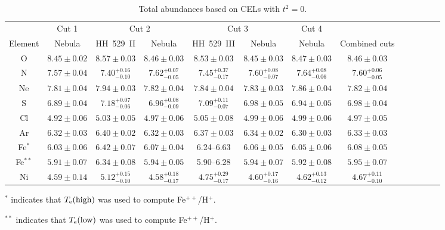 \documentclass[fleqn,usenatbib]{mnras}
\begin{document}
\begin{table*}
\centering
\caption{Total abundances based on CELs with $t^2=0$.}
\label{tab:total_abundances_cels}
\begin{adjustbox}{width=\textwidth}
\begin{tabular}{ccccccccccccc}
\hline
 & \multicolumn{1}{c}{Cut 1} & \multicolumn{2}{c}{Cut 2} & \multicolumn{2}{c}{Cut 3} & \multicolumn{1}{c}{Cut 4} \\
Element &  Nebula & HH~529~II &  Nebula & HH~529~III &  Nebula &  Nebula & Combined cuts\\
\hline

O & $8.45 \pm 0.02$ & $8.57 \pm 0.03$ & $8.46 \pm 0.03$ & $8.53 \pm 0.03$  & $8.45 \pm 0.03$&$8.47 \pm 0.03$&$8.46 \pm 0.03$\\

N & $7.57 \pm 0.04$ & $7.40 ^{+0.16} _{-0.10}$ & $7.62 ^{+0.07} _{-0.05}$ &  $7.45 ^{+0.37} _{-0.17}$  &$7.60 ^{+0.08} _{-0.07}$ & $7.64 ^{+0.08} _{-0.06}$&$7.60 ^{+0.06} _{-0.05}$\\

Ne & $7.81 \pm 0.04$ &$7.94 \pm 0.03$ & $7.82 \pm 0.04$ & $7.84 \pm 0.04$  &$7.83 \pm 0.03$ & $7.86 \pm 0.04$&$7.82 \pm 0.04$\\

S & $6.89 \pm 0.04$&$7.18 ^{+0.07} _{-0.06}$ & $6.96 ^{+0.08} _{-0.09}$ & $7.09 ^{+0.11} _{-0.07}$  & $6.98 \pm 0.05$ & $6.94 \pm 0.05$ &$6.98 \pm 0.04$ \\

Cl & $4.92 \pm 0.06$ & $5.03 \pm 0.05$ & $4.97 \pm 0.06$ & $5.05 \pm 0.08$  & $4.99\pm0.06$ &  $4.99 \pm 0.06$ & $4.97\pm0.05$ \\

Ar & $6.32 \pm 0.03$ & $6.40 \pm 0.02$ & $6.32 \pm 0.03$ & $6.37 \pm 0.03$  & $6.34 \pm 0.02$& $6.30 \pm 0.03$&$6.33 \pm 0.03$\\

Fe$^{*}$ & $6.03 \pm 0.06$ & $6.42 \pm 0.07$ & $6.07 \pm 0.04$ &  6.24--6.63 &$6.06 \pm 0.05$&$6.05 \pm 0.06$&$6.08 \pm 0.05$\\

Fe$^{**}$ & $5.91 \pm 0.07$ & $6.34 \pm 0.08$ & $5.94 \pm 0.05$ &  5.90--6.28 &$5.94 \pm 0.07$&$5.92 \pm 0.08$&$5.95 \pm 0.07$\\

Ni & $4.59 \pm 0.14$ & $5.12 ^{+0.15} _{-0.10}$ & $4.58 ^{+0.18} _{-0.17}$ &  $4.75 ^{+0.29} _{-0.17}$ & $4.60 ^{+0.17} _{-0.16}$&$4.62 ^{+0.13} _{-0.12}$&$4.67 ^{+0.11} _{-0.10}$\\

\hline
\end{tabular}
\end{adjustbox}
\begin{description}
\item $^*$ indicates that $T_{\rm e} (\text{high})$ was used to compute Fe$^{++}$/H$^+$. \\
\item $^{**}$ indicates that $T_{\rm e} (\text{low})$ was used to compute Fe$^{++}$/H$^+$. \\
\end{description}
\end{table*}
\end{document}
